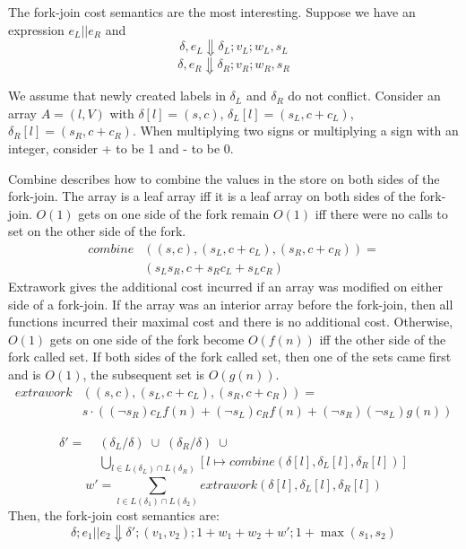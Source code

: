 \documentclass[preprint]{sigplanconf}
\begin{document}
The fork-join cost semantics are the most interesting. Suppose we have an expression $e_L || e_R$ and
\[ \delta, e_L \Downarrow \delta_L; v_L; w_L, s_L \]
\[ \delta, e_R \Downarrow \delta_R; v_R; w_R, s_R \]

We assume that newly created labels in $\delta_L$ and $\delta_R$ do not conflict. Consider an array $A = (l, V)$ with $\delta[l] = (s,c)$, $\delta_L[l] = (s_L, c + c_L)$, $\delta_R[l] = (s_R, c + c_R)$. When multiplying two signs or multiplying a sign with an integer, consider + to be 1 and - to be 0. 

Combine describes how to combine the values in the store on both sides of the fork-join. The array is a leaf array iff it is a leaf array on both sides of the fork-join. $O(1)$ gets on one side of the fork remain $O(1)$ iff there were no calls to set on the other side of the fork.
\begin{equation*}
  \begin{aligned}
   combine&((s, c), (s_L, c + c_L), (s_R, c + c_R))= \\
   &(s_L s_R, c + s_R c_L + s_L c_R)
  \end{aligned}
\end{equation*}
Extrawork gives the additional cost incurred if an array was modified on either side of a fork-join. If the array was an interior array before the fork-join, then all functions incurred their maximal cost and there is no additional cost. Otherwise, $O(1)$ gets on one side of the fork become $O(f(n))$ iff the other side of the fork called set. If both sides of the fork called set, then one of the sets came first and is $O(1)$, the subsequent set is $O(g(n))$.
\begin{equation*}
  \begin{aligned}
  extrawork&((s, c), (s_L, c + c_L), (s_R, c + c_R)) = \\
  &s \cdot ( (\neg s_R) c_L f(n)  + (\neg s_L) c_R f(n) + (\neg s_R) (\neg s_L) g(n) )
 \end{aligned}
\end{equation*}
										
\begin{equation*}
  \begin{aligned}
  \delta' = \; &(\delta_L / \delta) \; \cup \; (\delta_R / \delta) \; \cup \\
               &\bigcup_{l \in L(\delta_L) \cap L(\delta_R)} [l \mapsto combine(\delta[l], \delta_L[l], \delta_R[l])]
  \end{aligned}
\end{equation*}
$$w' = \sum_{l \in L(\delta_1) \cap L(\delta_2)} extrawork(\delta[l], \delta_L[l], \delta_R[l])$$
Then, the fork-join cost semantics are:
$$\delta; e_1 || e_2 \Downarrow \delta'; (v_1, v_2); 1 + w_1 + w_2 + w'; 1 + \max(s_1, s_2)$$
\end{document}
